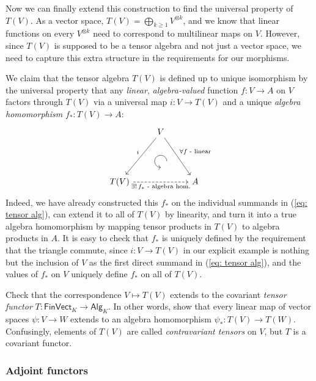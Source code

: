 \begin{example}
Now we can finally extend this construction to find the universal property of $T\left(V\right)$. As a vector space, $T(V)=\bigoplus_{k\geq 1}V^{\otimes k}$, and we know that linear functions on every $V^{\otimes k}$ need to correspond to multilinear maps on $V$. However, since $T(V)$ is supposed to be a tensor algebra and not just a vector space, we need to capture this extra structure in the requirements for our morphisms.

We claim that the tensor algebra $T(V)$ is defined up to unique isomorphism by the universal property that any \emph{linear}, \emph{algebra-valued} function $f:V\to A$ on $V$ factors through $T(V)$ via a universal map $i:V\to T(V)$ and a unique \emph{algebra homomorphism} $f_{\ast}:T(V)\to A$:
\[\begin{tikzcd}[every matrix/.append style={name=m},   
execute at end picture={\draw [<-] ([xshift=0mm,yshift=-6mm]m-2-2.north) arc[start angle=-90,delta angle=-270,radius=0.25cm];}]
   & V\arrow[ddl,swap,"i" ]\arrow[ddr,"\forall f\text{ - linear}"] & \\
   & \, & \\
   T(V) \arrow[rr,dashed,swap,"\exists!\,f_\ast\text{ - algebra hom.}"]& & A
\end{tikzcd}\]
Indeed, we have already constructed this $f_{\ast}$ on the individual
summands in (\ref{eq: tensor alg}), can extend it to all of $T(V)$
by linearity, and turn it into a true algebra homomorphism by mapping
tensor products in $T(V)$ to algebra products in $A$. It is easy
to check that $f_{\ast}$ is uniquely defined by the requirement that
the triangle commute, since $i:V\to T(V)$ in our explicit example
is nothing but the inclusion of $V$ as the first direct summand in
(\ref{eq: tensor alg}), and the values of $f_{\ast}$ on $V$ uniquely
define $f_{\ast}$ on all of $T(V)$.
\end{example}
\begin{xca}
Check that the correspondence $V\mapsto T(V)$ extends to the covariant
\emph{tensor functor} $T:\mathsf{FinVect}_{K}\to\mathsf{Alg}_{K}$.
In other words, show that every linear map of vector spaces $\psi:V\to W$
extends to an algebra homomorphism $\psi_{\ast}:T(V)\to T(W)$. Confusingly,
elements of $T(V)$ are called \emph{contravariant tensors} on $V$,
but $T$ is a covariant functor.
\end{xca}

\subsubsection{Adjoint functors}

